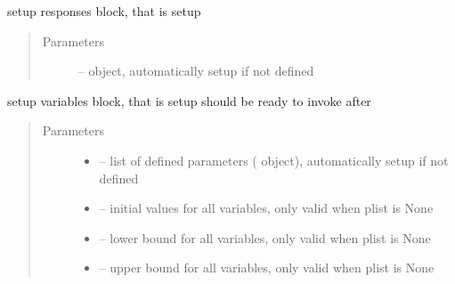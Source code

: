 \documentclass[letterpaper,10pt,english]{sphinxmanual}
\begin{document}
\begin{fulllineitems}
\begin{fulllineitems}
\begin{quote}
\begin{description}
\end{description}\end{quote}

\end{fulllineitems}


\begin{fulllineitems}
\label{\detokenize{src/apidocs/genopt:genopt.DakotaOC.set_responses}}
setup responses block, that is setup 
\begin{quote}\begin{description}
\item[{Parameters}] \leavevmode
{} --  object, automatically setup if not defined

\end{description}\end{quote}

\end{fulllineitems}


\begin{fulllineitems}
\label{\detokenize{src/apidocs/genopt:genopt.DakotaOC.set_variables}}
setup variables block, that is setup 
should be ready to invoke after 
\begin{quote}\begin{description}
\item[{Parameters}] \leavevmode\begin{itemize}
\item {} 
 -- list of defined parameters ( object), 
automatically setup if not defined

\item {} 
 -- initial values for all variables, only valid when plist is None

\item {} 
 -- lower bound for all variables, only valid when plist is None

\item {} 
 -- upper bound for all variables, only valid when plist is None


\end{itemize}
\end{description}
\end{quote}
\end{fulllineitems}
\end{fulllineitems}
\end{document}
